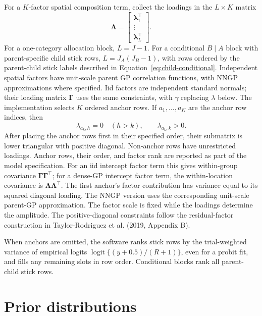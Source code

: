 \documentclass[11pt]{article}
\newcommand{\bGamma}{\bm{\Gamma}}
\newcommand{\bLambda}{\bm{\Lambda}}
\newcommand{\blambda}{\bm{\lambda}}
\newcommand{\trans}{^\top}
\newcommand{\logit}{\operatorname{logit}}
\begin{document}
For a \(K\)-factor spatial composition term, collect the loadings in the
\(L\times K\) matrix
\begin{equation}
  \bLambda =
  \begin{bmatrix}
    \blambda_1\trans\\
    \vdots\\
    \blambda_L\trans
  \end{bmatrix}.
  \label{eq:loading-matrix}
\end{equation}
For a one-category allocation block, \(L=J-1\). For a conditional
\(B\mid A\) block with parent-specific child stick rows, \(L=J_A(J_B-1)\), with
rows ordered by the parent-child stick labels described in
Equation~\ref{eq:child-conditional}.
Independent spatial factors have unit-scale parent GP correlation functions,
with NNGP approximations where specified. Iid factors are independent standard
normals; their loading matrix \(\bGamma\) uses the same constraints, with
\(\gamma\) replacing \(\lambda\) below.
The implementation selects \(K\) ordered anchor rows. If
\(a_1,\ldots,a_K\) are the anchor row indices, then
\begin{equation}
  \lambda_{a_k,h}=0 \quad(h>k),\qquad \lambda_{a_k,k}>0.
  \label{eq:triangular-zero}
\end{equation}
After placing the anchor rows first in their specified order, their submatrix
is lower triangular with positive diagonal.
Non-anchor rows have unrestricted loadings.
Anchor rows, their order, and factor rank are reported as part of the model
specification. For an iid intercept factor term this gives within-group
covariance \(\bGamma\bGamma\trans\); for a dense-GP intercept factor term,
the within-location covariance is \(\bLambda\bLambda\trans\). The first anchor's
factor contribution has variance equal to its squared diagonal loading.
The NNGP version uses the corresponding unit-scale parent-GP approximation.
The factor scale is fixed while the loadings determine the amplitude.
The positive-diagonal constraints follow the residual-factor construction
in Taylor-Rodriguez et al. (2019, Appendix B).

When anchors are omitted, the software ranks stick rows by the trial-weighted
variance of empirical logits \(\logit\{(y+0.5)/(R+1)\}\), even for a probit
fit, and fills any remaining slots in row order. Conditional blocks rank all
parent-child stick rows.

\section{Prior distributions}
\label{sec:priors}
\end{document}
